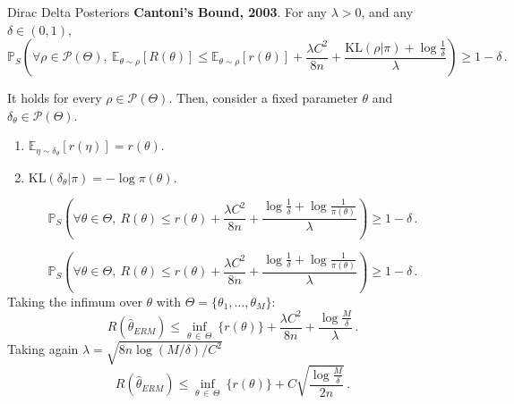 \documentclass[aspectratio=159]{beamer}
\begin{document}
    \begin{frame}{Dirac Delta Posteriors}
        \textbf{Cantoni's Bound, 2003}. For any \(\lambda > 0\), and any \(\delta \in (0,1)\),
        \[
        \mathbb{P}_S \left( \forall \rho \in \mathcal{P}(\Theta), \ \mathbb{E}_{\theta \sim \rho}[R(\theta)] \leq \mathbb{E}_{\theta \sim \rho}[r(\theta)] + \frac{\lambda C^2}{8n} + \frac{\text{KL}(\rho|\pi) + \log\tfrac{1}{\delta}}{\lambda}\right) \geq 1-\delta\,.
        \]

        It holds for every \(\rho \in \mathcal{P}(\Theta)\). Then, consider a fixed parameter \(\theta\) and \(\delta_\theta \in \mathcal{P}(\Theta)\).\pause
        \begin{enumerate}
            \item \(\mathbb{E}_{\eta \sim \delta_{\theta}}[r(\eta)] = r(\theta)\).
            \item \(\text{KL}(\delta_{\theta}|\pi) = -\log \pi(\theta)\).
        \end{enumerate}
        \[
            \mathbb{P}_S \left( \forall \theta \in\Theta, \ R(\theta) \leq r(\theta) + \frac{\lambda C^2}{8n} + \frac{\log\tfrac{1}{\delta} + \log\tfrac{1}{\pi(\theta)}}{\lambda}\right) \geq 1-\delta\,.
        \]
    \end{frame}
    \begin{frame}
        \[
            \mathbb{P}_S \left( \forall \theta \in\Theta, \ R(\theta) \leq r(\theta) + \frac{\lambda C^2}{8n} + \frac{\log\tfrac{1}{\delta} + \log\tfrac{1}{\pi(\theta)}}{\lambda}\right) \geq 1-\delta\,.
        \]
        Taking the infimum over \(\theta\) with \(\Theta = \{\theta_1, \dots, \theta_M\}\):
        \[
            R(\hat{\theta}_{ERM}) \leq \inf_{\theta\,  \in\,  \Theta} \ \{r(\theta)\} + \frac{\lambda C^2}{8n} + \frac{\log\tfrac{M}{\delta}}{\lambda}\,.
        \]
        Taking again \(\lambda = \sqrt{8n \log(M/\delta)/C^2}\)
        \[
            R(\hat{\theta}_{ERM}) \leq \inf_{\theta \, \in\,  \Theta} \ \{r(\theta)\} +C\sqrt{\frac{\log\tfrac{M}{\delta}}{2n}}\,.
        \]
    \end{frame}
\end{document}
